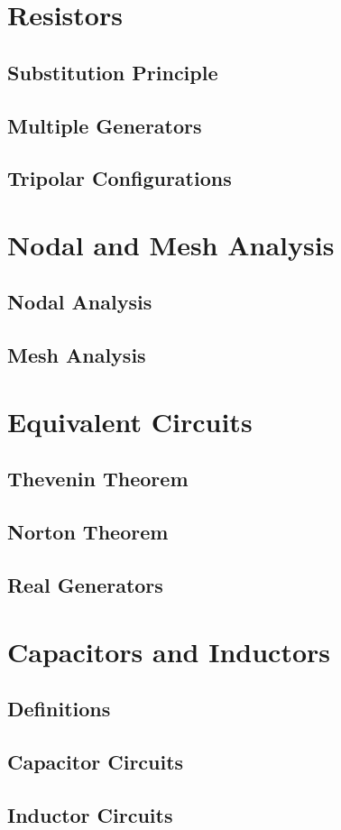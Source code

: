 \documentclass[../electromagnetism.tex]{subfiles}
\begin{document}
\section{Resistors}
\subsection{Substitution Principle}
\subsection{Multiple Generators}
\subsection{Tripolar Configurations}
\section{Nodal and Mesh Analysis}
\subsection{Nodal Analysis}
\subsection{Mesh Analysis}
\section{Equivalent Circuits}
\subsection{Thevenin Theorem}
\subsection{Norton Theorem}
\subsection{Real Generators}
\section{Capacitors and Inductors}
\subsection{Definitions}
\subsection{Capacitor Circuits}
\subsection{Inductor Circuits}
\end{document}
